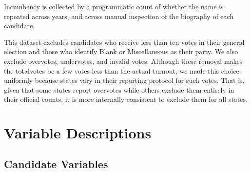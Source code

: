 \documentclass[12pt]{article}
\begin{document}
Incumbency is collected by a programmatic count of whether the name is repeated across years, and across manual inspection of the biography of each candidate.

This dataset excludes candidates who receive less than ten votes in their general election and those who identify Blank or Miscellaneous as their party.
We also exclude overvotes, undervotes, and invalid votes.
Although these removal makes the totalvotes be a few votes less than the actual turnout, we made this choice uniformly because states vary in their reporting protocol for such votes. That is, given that some states report overvotes while others exclude them entirely in their official counts, it is more internally consistent to exclude them for all states.

\clearpage
\section{Variable Descriptions}

\subsection{Candidate Variables}
\end{document}
